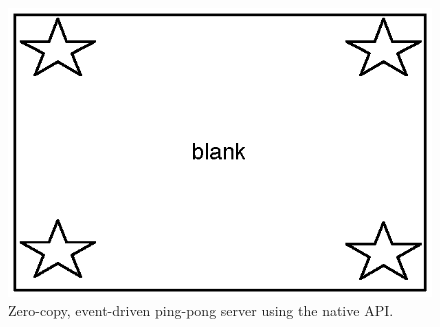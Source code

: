 \begin{figure}
\begin{centering}
\includegraphics{figs/blank.eps}
\caption{Zero-copy, event-driven ping-pong server using the native \ix API.}
\label{fig:listing}
\end{centering}
\end{figure}

